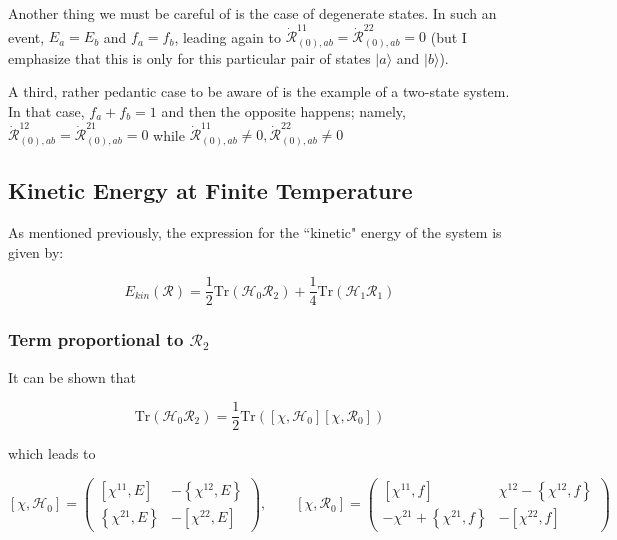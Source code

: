 Another thing we must be careful of is the case of degenerate states. In such an event, $E_a=E_b$ and $f_a=f_b$, leading again to $\mathcal{\dot{R}}^{11}_{(0),ab}=\mathcal{\dot{R}}^{22}_{(0),ab}=0$ (but I emphasize that this is only for this particular pair of states $|a\rangle$ and $|b\rangle$).

A third, rather pedantic case to be aware of is the example of a two-state system. In that case, $f_a+f_b=1$ and then the opposite happens; namely, $\mathcal{\dot{R}}^{12}_{(0),ab}=\mathcal{\dot{R}}^{21}_{(0),ab}=0$ while $\mathcal{\dot{R}}^{11}_{(0),ab}\neq0, \mathcal{\dot{R}}^{22}_{(0),ab}\neq0$

\subsection{Kinetic Energy at Finite Temperature}

As mentioned previously, the expression for the ``kinetic" energy of the system is given by:

\begin{equation*}
E_{kin}(\mathcal{R}) = \frac{1}{2}\mathrm{Tr}\left(\mathcal{H}_0\mathcal{R}_2\right) + \frac{1}{4}\mathrm{Tr}\left(\mathcal{H}_1\mathcal{R}_1\right)
\end{equation*}

\subsubsection{Term proportional to $\mathcal{R}_2$}

It can be shown that

\begin{equation*}
\mathrm{Tr}\left(\mathcal{H}_0\mathcal{R}_2\right) = \frac{1}{2}\mathrm{Tr}\left(\left[\chi,\mathcal{H}_0\right]\left[\chi,\mathcal{R}_0\right]\right)
\end{equation*}

\noindent which leads to

\begin{equation*}
\left[\chi, \mathcal{H}_0\right] = \left(\begin{array}{cc}
[\chi^{11},E] & -\left\{\chi^{12},E\right\} \\
\left\{\chi^{21},E\right\} & -[\chi^{22},E]
\end{array}\right), \qquad
\left[\chi, \mathcal{R}_0\right] = \left(\begin{array}{cc}
[\chi^{11},f] & \chi^{12}-\left\{\chi^{12},f\right\} \\
-\chi^{21}+\left\{\chi^{21},f\right\} & -[\chi^{22},f]
\end{array}\right)
\end{equation*}

